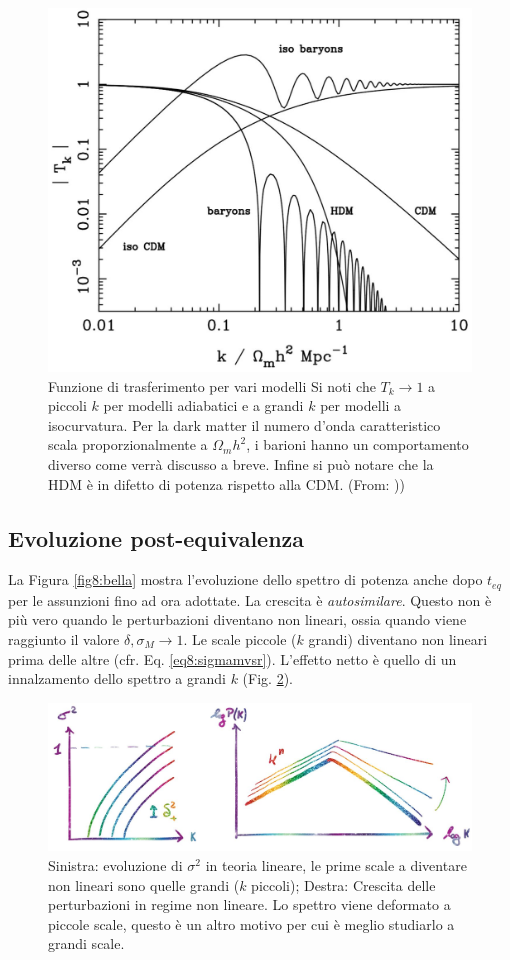 \vspace*{-1em}
\begin{figure}[H]
    \centering
    \includegraphics[width=.57 \textwidth]{Pictures/8/transfun.jpg}

    \caption{Funzione di trasferimento per vari modelli Si noti che $T_k\to 1$ a piccoli $k$ per modelli adiabatici e a grandi $k$ per modelli a isocurvatura. Per la dark matter il numero d'onda caratteristico scala proporzionalmente a $\Omega_m h^2$, i barioni hanno un comportamento diverso come verrà discusso a breve. Infine si può notare che la HDM è in difetto di potenza rispetto alla CDM. (From: \cite{peacock2003largescale}))}\label{fig8:transfun} 
\end{figure}



\subsection{Evoluzione post-equivalenza}
La Figura \ref{fig8:bella} mostra l'evoluzione dello spettro di potenza anche dopo $t_{eq}$ per le assunzioni fino ad ora adottate. La crescita è \textit{autosimilare}. Questo non è più vero quando le perturbazioni diventano non lineari, ossia quando viene raggiunto il valore $\delta, \sigma_M \to 1$. Le scale piccole ($k$ grandi) diventano non lineari prima delle altre (cfr. Eq. \ref{eq8:sigmamvsr}). L’effetto netto è quello di un innalzamento dello spettro a grandi $k$ (Fig. \ref{fig8:ultimabella}).

\begin{figure}[H]
    \centering
    \includegraphics[width=.95 \textwidth]{Pictures/8/truevol.jpg}
    \caption{Sinistra: evoluzione di $\sigma^2$ in teoria lineare, le prime scale a diventare non lineari sono quelle grandi ($k$ piccoli); Destra: Crescita delle perturbazioni in regime non lineare. Lo spettro viene deformato a piccole scale, questo è un altro motivo per cui è meglio studiarlo a  grandi scale.}\label{fig8:ultimabella}
\end{figure}


